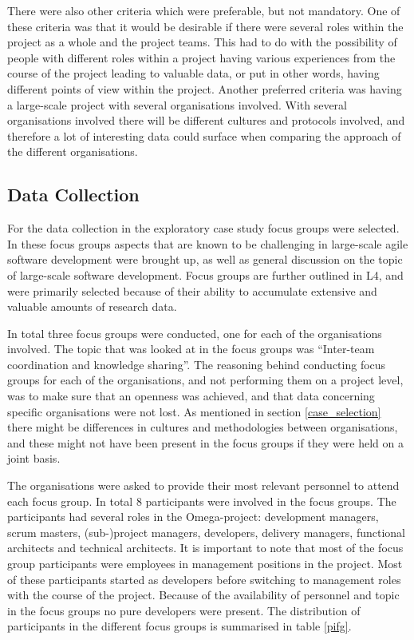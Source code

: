 There were also other criteria which were preferable, but not mandatory. One of these criteria was that it would be desirable if there were several roles within the project as a whole and the project teams. This had to do with the possibility of people with different roles within a project having various experiences from the course of the project leading to valuable data, or put in other words, having different points of view within the project. Another preferred criteria was having a large-scale project with several organisations involved. With several organisations involved there will be different cultures and protocols involved, and therefore a lot of interesting data could surface when comparing the approach of the different organisations.

\subsection{Data Collection}

For the data collection in the exploratory case study focus groups were selected. In these focus groups aspects that are known to be challenging in large-scale agile software development were brought up, as well as general discussion on the topic of large-scale software development. Focus groups are further outlined in L4, and were primarily selected because of their ability to accumulate extensive and valuable amounts of research data.

\vspace{0.5cm}


\vspace{0.5cm}

In total three focus groups were conducted, one for each of the organisations involved. The topic that was looked at in the focus groups was ``Inter-team coordination and knowledge sharing''. The reasoning behind conducting focus groups for each of the organisations, and not performing them on a project level, was to make sure that an openness was achieved, and that data concerning specific organisations were not lost. As mentioned in section \ref{case_selection} there might be differences in cultures and methodologies between organisations, and these might not have been present in the focus groups if they were held on a joint basis.

The organisations were asked to provide their most relevant personnel to attend each focus group. In total 8 participants were involved in the focus groups. The participants had several roles in the Omega-project: development managers, scrum masters, (sub-)project managers, developers, delivery managers, functional architects and technical architects. It is important to note that most of the focus group participants were employees in management positions in the project. Most of these participants started as developers before switching to management roles with the course of the project. Because of the availability of personnel and topic in the focus groups no pure developers were present. The distribution of participants in the different focus groups is summarised in table \ref{pifg}.

